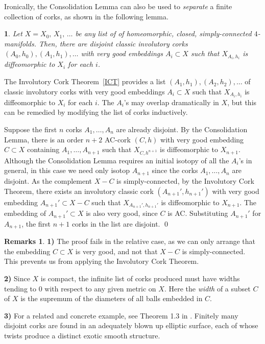 \documentclass[11pt]{amsart}
\newcommand{\thistheoremname}{}
\newtheorem{genericthm}[theorem]{\thistheoremname}
\newenvironment{namedtheorem}[1]
  {\renewcommand{\thistheoremname}{#1}%
   \begin{genericthm}}
  {\end{genericthm}}
\theoremstyle{definition}
\newtheorem*{remarks*}{Remarks}
\newcommand{\thmref}[1]{Theorem~\ref{#1}}
\newcommand{\ac}{\textup{AC}}
\begin{document}
Ironically, the Consolidation Lemma can also be used to \emph{separate} a finite collection of corks, as shown in the following lemma. 

\begin{namedtheorem}{Separation Lemma}\label{seplemma} 
Let $X = X_0,\,X_1,\,\dots$ be any list of of homeomorphic, closed, simply-connected $4$-manifolds. Then, there are disjoint classic involutory corks $(A_0, h_0), (A_1, h_1), \dots$ with very good embeddings $A_i \subset X$ such that $X_{A_i, h_i}$ is diffeomorphic to $X_i$ for each $i$. 
\end{namedtheorem}  

\proof 
The Involutory Cork \thmref{ICT} provides a list $(A_1, h_1), (A_2,h_2), \dots$ of classic involutory corks with very good embeddings $A_i \subset X$ such that $X_{A_i, h_i}$ is diffeomorphic to $X_i$ for each $i$. The $A_i$'s may overlap dramatically in $X$, but this can be remedied by modifying the list of corks inductively. 

Suppose the first $n$ corks $A_1, \dots, A_n$ are already disjoint. By the Consolidation Lemma, there is an order $n+2$ \ac-cork $(C, h)$ with very good embedding $C \subset X$ containing $A_1, \dots, A_{n+1}$ such that $X_{C, h^{n+1}}$ is diffeomorphic to $X_{n+1}$. Although the Consolidation Lemma requires an initial isotopy of all the $A_i$'s in general, in this case we need only isotop $A_{n+1}$ since the corks $A_1, \dots, A_n$ are disjoint. As the complement $X- C$ is simply-connected, by the Involutory Cork Theorem, there exists an involutory classic cork $(A_{n+1}', h_{n+1}')$ with very good embedding $A_{n+1}' \subset X- C$ such that $X_{A_{n+1}', h_{n+1}'}$ is diffeomorphic to $X_{n+1}$. The embedding of $A_{n+1}' \subset X$ is also very good, since $C$ is \ac. Substituting $A_{n+1}'$ for $A_{n+1}$, the first $n+1$ corks in the list are disjoint. 
\qed

\begin{remarks*} 
{\bf 1)} The proof fails in the relative case, as we can only arrange that the embedding $C \subset X$ is very good, and not that $X-C$ is simply-connected. This prevents us from applying the Involutory Cork Theorem. 

{\bf 2)}  Since $X$ is compact, the infinite list of corks produced must have widths tending to $0$ with respect to any given metric on $X$.  Here the {\it width} of a subset $C$ of $X$ is the supremum of the diameters of all balls embedded in $C$. 

{\bf 3)} For a related and concrete example, see Theorem 1.3 in \cite{akbulut-yasui:knotting-corks}. Finitely many disjoint corks are found in an adequately blown up elliptic surface, each of whose twists produce a distinct exotic smooth structure. 
\end{remarks*}
\end{document}
